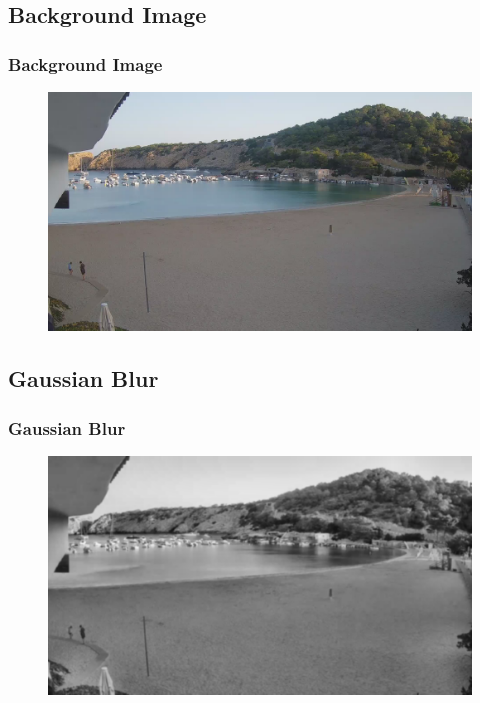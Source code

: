 \documentclass{beamer}
\begin{document}
\subsection*{Background Image}
\begin{frame}
    \frametitle{Background Image}

    \begin{figure}
        \centering
        \includegraphics[width=\textwidth]{../Gelabert/1660284000.jpg}
    \end{figure}

\end{frame}

\subsection*{Gaussian Blur}
\begin{frame}
    \frametitle{Gaussian Blur}
    \begin{figure}
        \centering
        \includegraphics[width=\textwidth]{../gen/blur.png}
    \end{figure}

\end{frame}
\end{document}
